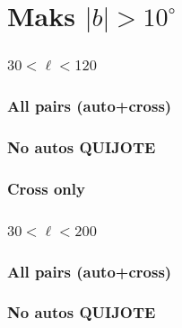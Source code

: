 

\section{Maks $|b| > 10^{\circ}$}

\subsubsection*{$30 < \ell < 120$}

\subsubsection*{All pairs (auto+cross)}




\subsubsection*{No autos QUIJOTE}





\subsubsection*{Cross only}




\clearpage

\subsubsection*{$30 < \ell < 200$}

\subsubsection*{All pairs (auto+cross)}



\subsubsection*{No autos QUIJOTE}



